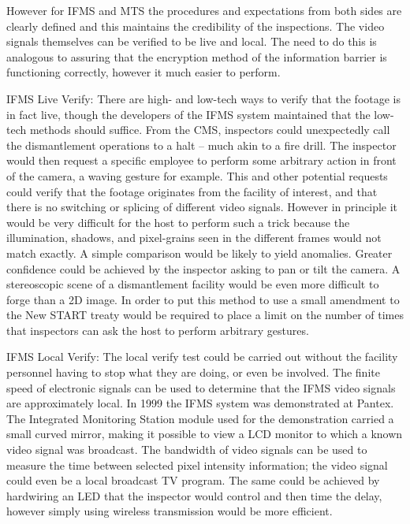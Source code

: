\documentclass[twoside,titlepage,11pt,twocolumn,a4paper]{article}
\begin{document}
However for IFMS and MTS the procedures and expectations from both
sides are clearly defined and this maintains the credibility of the
inspections. The video signals themselves can be verified to be live
and local. The need to do this is analogous to assuring that the
encryption method of the information barrier is functioning correctly,
however it much easier to perform.

IFMS Live Verify: There are high- and low-tech ways to verify 
that the footage is in fact live, though the developers of the 
IFMS system maintained that the low-tech methods should suffice. 
From the CMS, inspectors could unexpectedly call the 
dismantlement operations to a halt -- much akin to a fire drill. 
The inspector would then request a specific employee to perform 
some arbitrary action in front of the camera, a waving gesture 
for example. This and other potential requests could verify that 
the footage originates from the facility of interest, and that 
there is no switching or splicing of different video signals. 
However in principle it would be very difficult for the host 
to perform such a trick because the illumination, shadows, 
and pixel-grains seen in the different frames would not match 
exactly. A simple comparison would be likely to yield anomalies. 
Greater confidence could be achieved by the inspector asking 
to pan or tilt the camera. A stereoscopic scene of a dismantlement 
facility would be even more difficult to forge than a 2D image.  
In order to put this method to use a small amendment to the New 
START treaty would be required to place a limit on the number 
of times that inspectors can ask the host to perform arbitrary 
gestures. 

IFMS Local Verify: The local verify test could be carried out 
without the facility personnel having to stop what they are 
doing, or even be involved. The finite speed of electronic 
signals can be used to determine that the IFMS video signals 
are approximately local. In 1999 the IFMS system was 
demonstrated at Pantex. The Integrated Monitoring Station 
module used for the demonstration carried a small curved 
mirror, making it possible to view a LCD monitor to which 
a known video signal was broadcast. The bandwidth of video 
signals can be used to measure the time between selected
pixel intensity information; the video signal could even 
be a local broadcast TV program. The same could be achieved 
by hardwiring an LED that the inspector would control and 
then time the delay, however simply using wireless 
transmission would be more efficient. \citep{gerdes2001}
\end{document}
